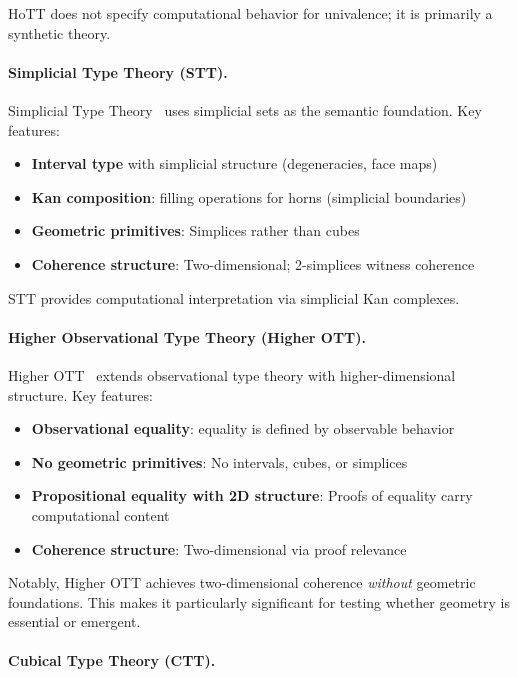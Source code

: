 \documentclass[11pt]{article}
\theoremstyle{definition}
\theoremstyle{remark}
\begin{document}
HoTT does not specify computational behavior for univalence; it is primarily a synthetic theory.

\paragraph{Simplicial Type Theory (STT).}

Simplicial Type Theory~\cite{riehl2017type} uses simplicial sets as the semantic foundation. Key features:
\begin{itemize}
\item \textbf{Interval type} with simplicial structure (degeneracies, face maps)
\item \textbf{Kan composition}: filling operations for horns (simplicial boundaries)
\item \textbf{Geometric primitives}: Simplices rather than cubes
\item \textbf{Coherence structure}: Two-dimensional; 2-simplices witness coherence
\end{itemize}

STT provides computational interpretation via simplicial Kan complexes.

\paragraph{Higher Observational Type Theory (Higher OTT).}

Higher OTT~\cite{altenkirch2007observational} extends observational type theory with higher-dimensional structure. Key features:
\begin{itemize}
\item \textbf{Observational equality}: equality is defined by observable behavior
\item \textbf{No geometric primitives}: No intervals, cubes, or simplices
\item \textbf{Propositional equality with 2D structure}: Proofs of equality carry computational content
\item \textbf{Coherence structure}: Two-dimensional via proof relevance
\end{itemize}

Notably, Higher OTT achieves two-dimensional coherence \emph{without} geometric foundations. This makes it particularly significant for testing whether geometry is essential or emergent.

\paragraph{Cubical Type Theory (CTT).}
\end{document}
